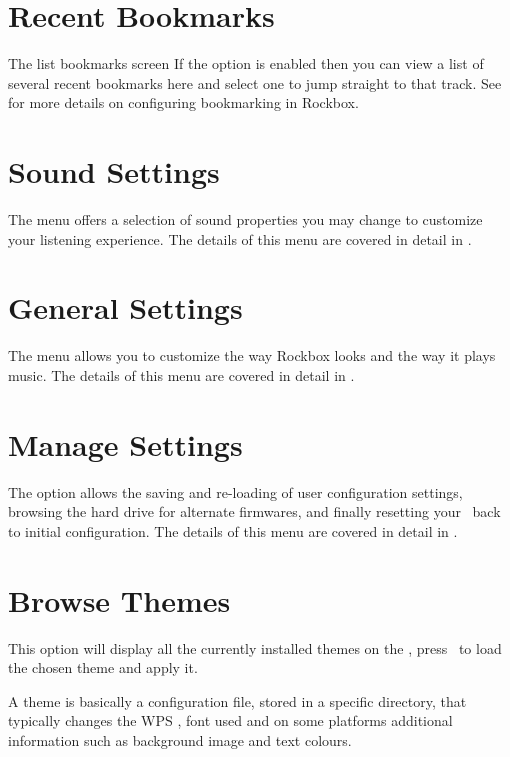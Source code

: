 \section {Recent Bookmarks}
%
  {The list bookmarks screen}{}
If the  option is enabled 
then you can view a list of several recent bookmarks here and select one to 
jump straight to that track. See  
for more details on configuring bookmarking in Rockbox.

\section{Sound Settings}
The  menu offers a selection of sound properties you may 
change to customize your listening experience.  The details of this menu are 
covered in detail in . 

\section{General Settings}
The  menu allows you to customize the way Rockbox looks 
and the way it plays music.  The details of this menu are covered in detail in 
.

\section{Manage Settings}
The  option allows the saving and re-loading of user 
configuration settings, browsing the hard drive for alternate firmwares, and finally
resetting your \dap\ back to initial configuration. 
%
%
The details of this menu are covered in detail in 
.

\section{Browse Themes}
This option will display all the currently installed themes on the \dap, 
press \ButtonRight\ to load the chosen theme and apply it.

A theme is basically a configuration file, stored in a specific directory, 
that typically changes the WPS 
, font used and on some platforms
additional information such as background image and text colours.


